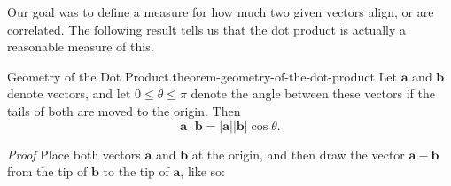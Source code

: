 \documentclass[10pt,]{book}
\makeatletter
\renewcommand*{\proofname}{Proof}
\renewenvironment{proof}[1][\proofname]{\par
  \pushQED{\qed}%
  \normalfont \topsep6\p@\@plus6\p@\relax
  \trivlist
  \item\relax
    {\itshape
    #1\@addpunct{.}}\hspace\labelsep\ignorespaces
}{%
  \popQED\endtrivlist\@endpefalse
}
\numberwithin{equation}{section}
\newcommand{\vv}[1]{\mathbf{#1}}
\makeatother
\begin{document}
\hypertarget{p-1139}{}%
Our goal was to define a measure for how much two given vectors align, or are correlated. The following result tells us that the dot product is actually a reasonable measure of this.%
\begin{theorem}{Geometry of the Dot Product.}{}{theorem-geometry-of-the-dot-product}%
\hypertarget{p-1140}{}%
Let \(\vv{a}\) and \(\vv{b}\) denote vectors, and let \(0\leq\theta\leq\pi\) denote the angle between these vectors if the tails of both are moved to the origin. Then%
%
\begin{equation*}
\vv{a}\cdot\vv{b} = |\vv{a}||\vv{b}|\cos\theta.
\end{equation*}
\end{theorem}
\begin{proof}\hypertarget{proof-15}{}
\hypertarget{p-1141}{}%
Place both vectors \(\vv{a}\) and \(\vv{b}\) at the origin, and then draw the vector \(\vv{a}-\vv{b}\) from the tip of \(\vv{b}\) to the tip of \(\vv{a}\), like so:%
\begin{figure}
\centering
{
}
\end{figure}
\end{proof}
\end{document}
